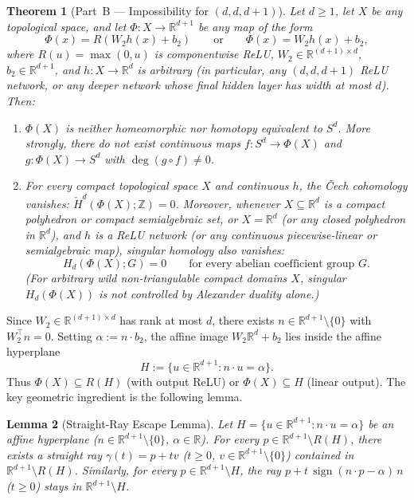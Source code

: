 \documentclass[11pt]{article}
\theoremstyle{plain}
\newtheorem{theorem}{Theorem}
\newtheorem{lemma}[theorem]{Lemma}
\theoremstyle{definition}
\theoremstyle{remark}
\DeclareMathOperator{\sign}{sign}
\begin{document}
\begin{theorem}[Part~B --- Impossibility for $(d, d, d+1)$]\label{thm:partB}
Let $d \ge 1$, let $X$ be any topological space, and let $\Phi : X \to \mathbb{R}^{d+1}$ be any map of the form
\[
\Phi(x) = R(W_2 h(x) + b_2) \qquad \text{or} \qquad \Phi(x) = W_2 h(x) + b_2,
\]
where $R(u) = \max(0, u)$ is componentwise ReLU, $W_2 \in \mathbb{R}^{(d+1)\times d}$, $b_2 \in \mathbb{R}^{d+1}$, and $h : X \to \mathbb{R}^d$ is arbitrary (in particular, any $(d, d, d+1)$ ReLU network, or any deeper network whose final hidden layer has width at most $d$). Then:
\begin{enumerate}[label=\textup{(\arabic*)}]
\item $\Phi(X)$ is neither homeomorphic nor homotopy equivalent to $S^d$. More strongly, there do not exist continuous maps $f : S^d \to \Phi(X)$ and $g : \Phi(X) \to S^d$ with $\deg(g \circ f) \neq 0$.
\item For every compact topological space $X$ and continuous $h$, the \v{C}ech cohomology vanishes: $\check{H}^d(\Phi(X); \mathbb{Z}) = 0$. Moreover, whenever $X \subseteq \mathbb{R}^d$ is a compact polyhedron or compact semialgebraic set, or $X = \mathbb{R}^d$ (or any closed polyhedron in $\mathbb{R}^d$), and $h$ is a ReLU network (or any continuous piecewise-linear or semialgebraic map), singular homology also vanishes:
\[
H_d(\Phi(X); G) = 0 \qquad \text{for every abelian coefficient group } G.
\]
(For arbitrary wild non-triangulable compact domains $X$, singular $H_d(\Phi(X))$ is not controlled by Alexander duality alone.)
\end{enumerate}
\end{theorem}

Since $W_2 \in \mathbb{R}^{(d+1)\times d}$ has rank at most $d$, there exists $n \in \mathbb{R}^{d+1} \setminus \{0\}$ with $W_2^\top n = 0$. Setting $\alpha := n \cdot b_2$, the affine image $W_2 \mathbb{R}^d + b_2$ lies inside the affine hyperplane
\[
H := \{u \in \mathbb{R}^{d+1} : n \cdot u = \alpha\}.
\]
Thus $\Phi(X) \subseteq R(H)$ (with output ReLU) or $\Phi(X) \subseteq H$ (linear output). The key geometric ingredient is the following lemma.

\begin{lemma}[Straight-Ray Escape Lemma]\label{lem:escape}
Let $H = \{u \in \mathbb{R}^{d+1} : n \cdot u = \alpha\}$ be an affine hyperplane ($n \in \mathbb{R}^{d+1} \setminus \{0\}$, $\alpha \in \mathbb{R}$). For every $p \in \mathbb{R}^{d+1} \setminus R(H)$, there exists a straight ray $\gamma(t) = p + t v$ ($t \ge 0$, $v \in \mathbb{R}^{d+1} \setminus \{0\}$) contained in $\mathbb{R}^{d+1} \setminus R(H)$. Similarly, for every $p \in \mathbb{R}^{d+1} \setminus H$, the ray $p + t\,\sign(n \cdot p - \alpha)\,n$ ($t \ge 0$) stays in $\mathbb{R}^{d+1} \setminus H$.
\end{lemma}
\end{document}
